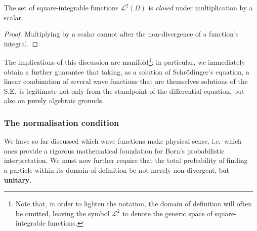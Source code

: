 \begin{proprietà}
    The set of square-integrable functions $\mathcal{L}^2(\Omega)$ is \emph{closed} under multiplication by a scalar.
\end{proprietà}
\begin{proof}
    Multiplying by a scalar cannot alter the non-divergence of a function's integral.
\end{proof}

The implications of this discussion are manifold\footnote{Note that, in order to lighten the notation, the domain of definition will often be omitted, leaving the symbol $\mathcal{L}^2$ to denote the generic space of square-integrable functions.}; in particular, we immediately obtain a further guarantee that taking, as a solution of Schrödinger's equation, a linear combination of several wave functions that are themselves solutions of the S.E.\ is legitimate not only from the standpoint of the differential equation, but also on purely algebraic grounds.

\subsubsection{The normalisation condition}
We have so far discussed which wave functions make physical sense, i.e.\ which ones provide a rigorous mathematical foundation for Born's probabilistic interpretation. We must now further require that the total probability of finding a particle within its domain of definition be not merely non-divergent, but \textbf{unitary}.

